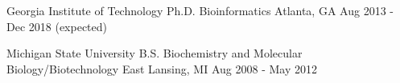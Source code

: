 \vspace{1.0mm}

\begin{cventries}

  \cventry
  	{Georgia Institute of Technology} %
    {Ph.D. Bioinformatics} %
    {Atlanta, GA} %
    {Aug 2013 - Dec 2018 \tiny {(expected)}} %
    {}

\vspace{-1.2em}

  \cventry
  	{Michigan State University} %
    {B.S. Biochemistry and Molecular Biology/Biotechnology} %
    {East Lansing, MI} %
    {Aug 2008 - May 2012} %
    {}
	
\vspace{-2em}


\end{cventries}
